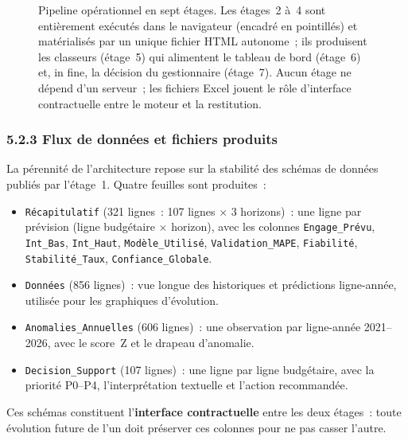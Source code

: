 \begin{figure}[h]
\caption{Pipeline op\'erationnel en sept \'etages. Les \'etages~2 \`a~4
sont enti\`erement ex\'ecut\'es dans le navigateur (encadr\'e en pointill\'es)
et mat\'erialis\'es par un unique fichier HTML autonome~; ils produisent
les classeurs (\'etage~5) qui alimentent le tableau de bord (\'etage~6) et,
in fine, la d\'ecision du gestionnaire (\'etage~7). Aucun \'etage ne d\'epend
d'un serveur~; les fichiers Excel jouent le r\^ole d'interface contractuelle
entre le moteur et la restitution.}
\label{fig:archi}
\end{figure}

\subsubsection*{5.2.3 \quad Flux de donn\'ees et fichiers produits}

La p\'erennit\'e de l'architecture repose sur la stabilit\'e des sch\'emas
de donn\'ees publi\'es par l'\'etage~1. Quatre feuilles sont produites~:

\begin{itemize}
    \item \texttt{R\'ecapitulatif} (321 lignes~: 107 lignes $\times$ 3
    horizons)~: une ligne par pr\'evision (ligne budg\'etaire $\times$
    horizon), avec
    les colonnes \texttt{Engage\_Pr\'evu}, \texttt{Int\_Bas},
    \texttt{Int\_Haut}, \texttt{Mod\`ele\_Utilis\'e},
    \texttt{Validation\_MAPE}, \texttt{Fiabilit\'e},
    \texttt{Stabilit\'e\_Taux}, \texttt{Confiance\_Globale}.
    \item \texttt{Donn\'ees} (856 lignes)~: vue \og longue \fg{} des
    historiques et pr\'edictions ligne-ann\'ee, utilis\'ee pour les
    graphiques d'\'evolution.
    \item \texttt{Anomalies\_Annuelles} (606 lignes)~: une observation par
    ligne-ann\'ee 2021--2026, avec le score~Z et le drapeau d'anomalie.
    \item \texttt{Decision\_Support} (107 lignes)~: une ligne par ligne
    budg\'etaire, avec la priorit\'e P0--P4, l'interpr\'etation textuelle
    et l'action recommand\'ee.
\end{itemize}

Ces sch\'emas constituent l'\textbf{interface contractuelle} entre les deux
\'etages~: toute \'evolution future de l'un doit pr\'eserver ces colonnes
pour ne pas casser l'autre.

